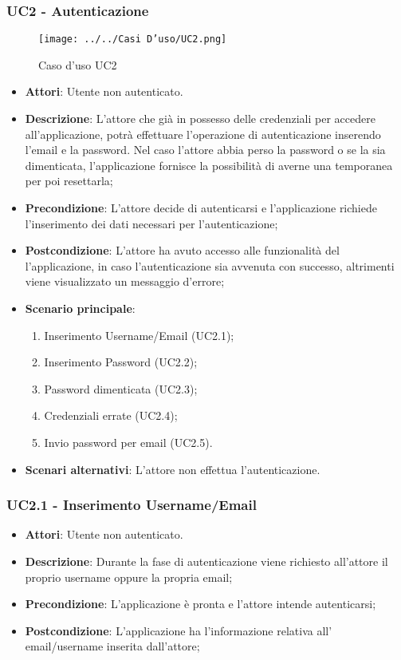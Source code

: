 \subsubsection{UC2 - Autenticazione} 
\label{sssec:UC2} 
\begin{figure}[h!] 
\centering 
\texttt{[image: ../../Casi D'uso/UC2.png]} 
\caption{Caso d'uso UC2} 
 \end{figure} 
\begin{itemize} 
\item \textbf{Attori}: Utente non autenticato.
\item \textbf{Descrizione}: L'attore che già in possesso delle credenziali per accedere all'applicazione, potrà effettuare l'operazione di autenticazione inserendo l'email e la password. Nel caso l’attore abbia perso la password o se la sia dimenticata, l'applicazione fornisce la possibilità di averne una temporanea per poi resettarla;
\item \textbf{Precondizione}: L'attore decide di autenticarsi e l'applicazione richiede l'inserimento dei dati necessari per l'autenticazione;
\item \textbf{Postcondizione}: L'attore ha avuto accesso alle funzionalità del l'applicazione, in caso l'autenticazione sia avvenuta con successo, altrimenti viene visualizzato un messaggio d'errore;
\item \textbf{Scenario principale}: \begin{enumerate}\item Inserimento Username/Email (UC2.1);\item Inserimento Password (UC2.2);\item Password dimenticata (UC2.3);\item Credenziali errate (UC2.4);\item Invio password per email (UC2.5). 
 \end{enumerate}
\item \textbf{Scenari alternativi}: L’attore non effettua l’autenticazione.
\end{itemize} 
\subsubsection{UC2.1 - Inserimento Username/Email} 
\label{sssec:UC2.1} 
\begin{itemize} 
\item \textbf{Attori}: Utente non autenticato.
\item \textbf{Descrizione}: Durante la fase di autenticazione viene richiesto all'attore il proprio username oppure la propria email;
\item \textbf{Precondizione}: L'applicazione è pronta e l'attore intende autenticarsi;
\item \textbf{Postcondizione}: L'applicazione ha l’informazione relativa all' email/username inserita dall’attore;
\end{itemize} 
